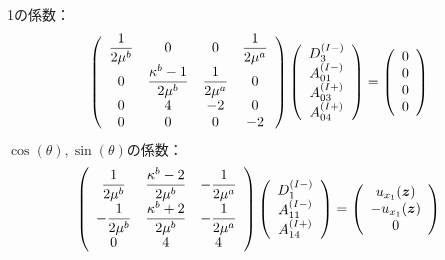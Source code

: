 1の係数：
\begin{align}
	\left(
	\begin{array}{cccc}
		{\displaystyle\frac{1}{2\mu^b}}& 0 & 0 & {\displaystyle\frac{1}{2\mu^a}} \\
		0 & {\displaystyle\frac{\kappa^b-1}{2\mu^b}} & {\displaystyle\frac{1}{2\mu^a}} & 0 \\
		0 & 4 & -2 & 0 \\
		0 & 0 & 0 & -2 \\
	\end{array}
	\right)
	\left(
	\begin{array}{c}
		D_{3}^{(I-)} \\
	 	A_{01}^{(I-)} \\
		A_{03}^{(I+)}\\
	 	A_{04}^{(I+)} \\
	\end{array}
	\right)
	=
	\left(
	\begin{array}{c}
		0 \\
	 	0 \\
		0 \\
	 	0 \\
	\end{array}
	\right)
\end{align}
$\cos(\theta),\sin(\theta)$の係数：
\begin{align}
	\left(
	\begin{array}{ccc}
		{\displaystyle\frac{1}{2\mu^b}}& {\displaystyle\frac{\kappa^b-2}{2\mu^b}} & {\displaystyle-\frac{1}{2\mu^a}} \\
		{\displaystyle-\frac{1}{2\mu^b}} & {\displaystyle\frac{\kappa^b+2}{2\mu^b}} & {\displaystyle-\frac{1}{2\mu^a}} \\
		0 & 4 & 4 \\
	\end{array}
	\right)
	\left(
	\begin{array}{c}
		D_{1}^{(I-)} \\
	 	A_{11}^{(I-)} \\
	 	A_{14}^{(I+)} \\
	\end{array}
	\right)
	=
	\left(
	\begin{array}{c}
		u_{x_{1}}(\bm{z}) \\
	 	-u_{x_{1}}(\bm{z}) \\
	 	0 \\
	\end{array}
	\right)
\end{align}
